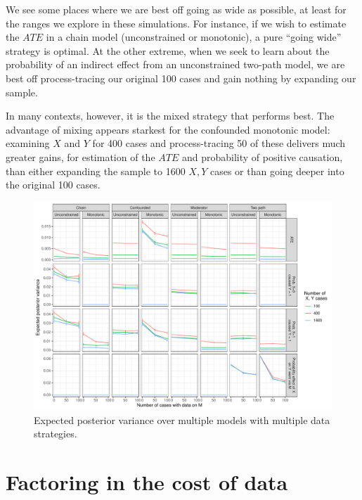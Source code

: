 \documentclass[
  12pt,
]{book}
\begin{document}
We see some places where we are best off going as wide as possible, at least for the ranges we explore in these simulations. For instance, if we wish to estimate the \(ATE\) in a chain model (unconstrained or monotonic), a pure ``going wide'' strategy is optimal. At the other extreme, when we seek to learn about the probability of an indirect effect from an unconstrained two-path model, we are best off process-tracing our original 100 cases and gain nothing by expanding our sample.

In many contexts, however, it is the mixed strategy that performs best. The advantage of mixing appears starkest for the confounded monotonic model: examining \(X\) and \(Y\) for 400 cases and process-tracing 50 of these delivers much greater gains, for estimation of the \(ATE\) and probability of positive causation, than either expanding the sample to 1600 \(X,Y\) cases or than going deeper into the original 100 cases.

\begin{figure}

{\centering \includegraphics{ii_files/figure-latex/morn3-1} 

}

\caption{Expected posterior variance over multiple models with multiple data strategies.}\label{fig:morn3}
\end{figure}

\hypertarget{factoring-in-the-cost-of-data}{%
\section{Factoring in the cost of data}\label{factoring-in-the-cost-of-data}}
\end{document}
